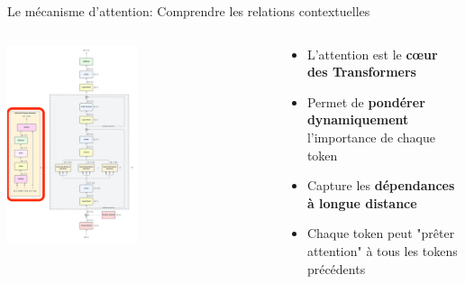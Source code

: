 \documentclass[aspectratio=169]{beamer}
\begin{document}
\begin{frame}{Le mécanisme d'attention: Comprendre les relations contextuelles}
    \begin{columns}
        \begin{column}{0.5\textwidth}
            \begin{center}
                \includegraphics[width=0.5\textwidth]{images/gpt2_attn.png}
            \end{center}
        \end{column}
        \begin{column}{0.5\textwidth}
            \begin{itemize}
                \item L'attention est le \textbf{cœur des Transformers}
                \item Permet de \textbf{pondérer dynamiquement} l'importance de chaque token
                \item Capture les \textbf{dépendances à longue distance}
                \item Chaque token peut "prêter attention" à tous les tokens précédents
            \end{itemize}
        \end{column}
    \end{columns}
\end{frame}
\end{document}
